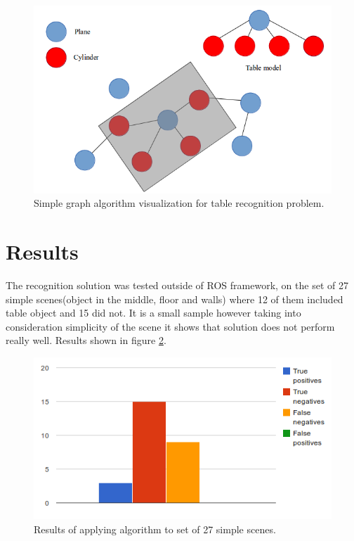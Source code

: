 \documentclass[12pt,oneside]{amsart}
\begin{document}
\begin{figure}
  \includegraphics[scale=0.5]{images/graph}
  \caption{Simple graph algorithm visualization for table recognition problem.}
  \label{graphAlg}
\end{figure}

\section{Results}
The recognition solution was tested outside of ROS framework, on the set of 27 simple scenes(object in the middle, floor and walls) where 12 of them included table object and 15 did not. It is a small sample however taking into consideration simplicity of the scene it shows that solution does not perform really well. Results shown in figure \ref{fig:resultChart}.

\begin{figure}
  \includegraphics[scale=0.7]{images/resultChart}
  \caption{Results of applying algorithm to set of 27 simple scenes.}
  \label{fig:resultChart}
\end{figure}
\end{document}
